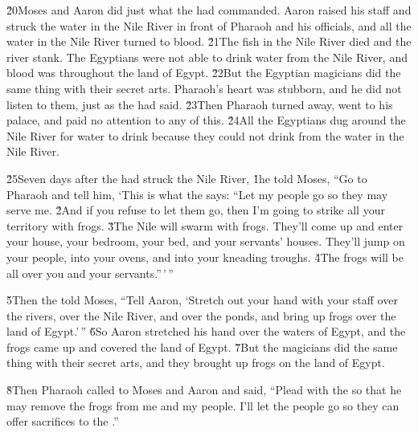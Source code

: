 \v{20}Moses and Aaron did just what the  had commanded. Aaron raised his staff and struck the water in the Nile River in front of Pharaoh and his officials, and all the water in the Nile River turned to blood. \v{21}The fish in the Nile River died and the river stank. The Egyptians were not able to drink water from the Nile River, and blood was throughout the land of Egypt. \v{22}But the Egyptian magicians did the same thing with their secret arts. Pharaoh's heart was stubborn, and he did not listen to them, just as the  had said. \v{23}Then Pharaoh turned away, went to his palace, and paid no attention to any of this. \v{24}All the Egyptians dug around the Nile River for water to drink because they could not drink from the water in the Nile River.

\v{25}Seven days after the  had struck the Nile River,
\v{1}he told Moses, ``Go to Pharaoh and tell him, `This is what the  says: ``Let my people go so they may serve me. \v{2}And if you refuse to let them go, then I'm going to strike all your territory with frogs. \v{3}The Nile will swarm with frogs. They'll come up and enter your house, your bedroom, your bed, and your servants' houses. They'll jump on your people, into your ovens, and into your kneading troughs. \v{4}The frogs will be all over you and your servants.''\,'\,''

\v{5}Then the  told Moses, ``Tell Aaron, `Stretch out your hand with your staff over the rivers, over the Nile River, and over the ponds, and bring up frogs over the land of Egypt.'\,'' \v{6}So Aaron stretched his hand over the waters of Egypt, and the frogs came up and covered the land of Egypt. \v{7}But the magicians did the same thing with their secret arts, and they brought up frogs on the land of Egypt.

\v{8}Then Pharaoh called to Moses and Aaron and said, ``Plead with the  so that he may remove the frogs from me and my people. I'll let the people go so they can offer sacrifices to the .''

